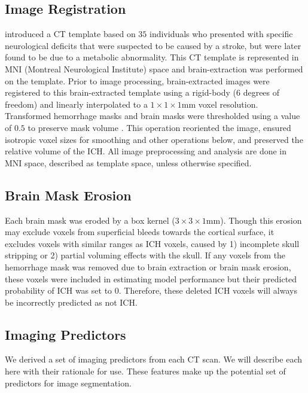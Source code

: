 \documentclass{elsarticle_nonatbib}\usepackage[]{graphicx}\usepackage[]{color}
\begin{document}
\subsection{Image Registration}
\citet{rorden_age-specific_2012} introduced a CT template based on $35$ individuals who presented with specific neurological deficits that were suspected to be caused by a stroke, but were later found to be due to a metabolic abnormality.  This CT template is represented in MNI (Montreal Neurological Institute) space and brain-extraction was performed on the template.  Prior to image processing, brain-extracted images were registered to this brain-extracted template using a rigid-body (6 degrees of freedom) and linearly interpolated to a $1\times1\times1$mm voxel resolution.  Transformed hemorrhage masks and brain masks were thresholded using a value of $0.5$ to preserve mask volume \cite{flirt_reg}. This operation reoriented the image, ensured isotropic voxel sizes for smoothing and other operations below, and preserved the relative volume of the ICH.  All image preprocessing and analysis are done in MNI space, described as template space, unless otherwise specified.


\subsection{Brain Mask Erosion}
Each brain mask was eroded by a box kernel ($3\times3\times1$mm).  Though this erosion may exclude voxels from superficial bleeds towards the cortical surface, it excludes voxels with similar ranges as ICH voxels, caused by 1) incomplete skull stripping or 2) partial voluming effects with the skull.  If any voxels from the hemorrhage mask was removed due to brain extraction or brain mask erosion, these voxels were included in estimating model performance but their predicted probability of ICH was set to $0$.  Therefore, these deleted ICH voxels will always be incorrectly predicted as not ICH.  




\subsection{Imaging Predictors}
We derived a set of imaging predictors from each CT scan.  We will describe each here with their rationale for use.  These features make up the potential set of predictors for image segmentation.
\end{document}
